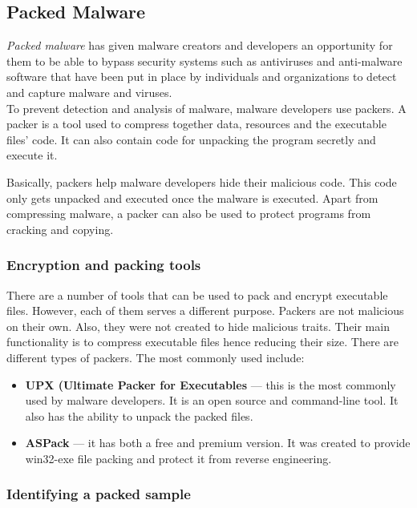 \subsection{Packed Malware}
\textit{Packed malware} has given malware creators and developers an opportunity for them to be able to bypass security systems such as antiviruses and anti-malware software that have been put in place by individuals and organizations to detect and capture malware and viruses.\\

To prevent detection and analysis of malware, malware developers use packers. A packer is a tool used to compress together data, resources and the executable files' code. It can also contain code for unpacking the program secretly and execute it.

Basically, packers help malware developers hide their malicious code. This code only gets unpacked and executed once the malware is executed. Apart from compressing malware, a packer can also be used to protect programs from cracking and copying.

\subsubsection{Encryption and packing tools}
There are a number of tools that can be used to pack and encrypt executable files. However, each of them serves a different purpose. Packers are not malicious on their own. Also, they were not created to hide malicious traits. Their main functionality is to compress executable files hence reducing their size. There are different types of packers. The most commonly used include:\\

\begin{itemize}
    \item \textbf{UPX (Ultimate Packer for Executables} — this is the most commonly used by malware developers. It is an open source and command-line tool. It also has the ability to unpack the packed files.
    \item \textbf{ASPack} — it has both a free and premium version. It was created to provide win32-exe file packing and protect it from reverse engineering.
\end{itemize}

\columnbreak

\subsubsection{Identifying a packed sample}

